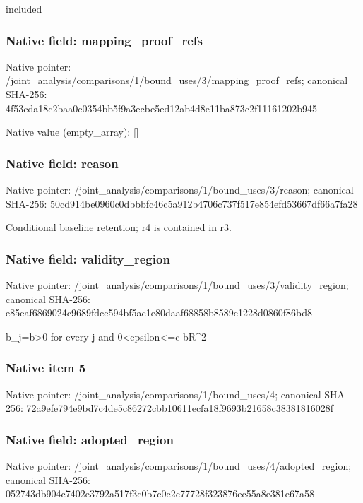 \documentclass[10pt,a4paper]{article}
\begin{document}
\begingroup\raggedright\sloppy included\par\endgroup

\subsubsection{Native field: mapping\_\allowbreak{}proof\_\allowbreak{}refs}
Native pointer: /joint\_\allowbreak{}analysis/comparisons/1/bound\_\allowbreak{}uses/3/mapping\_\allowbreak{}proof\_\allowbreak{}refs; canonical SHA-256: 4f53cda18c2baa0c0354bb5f9a3ecbe5ed12ab4d8e11ba873c2f11161202b945

Native value (empty\_\allowbreak{}array): []

\subsubsection{Native field: reason}
Native pointer: /joint\_\allowbreak{}analysis/comparisons/1/bound\_\allowbreak{}uses/3/reason; canonical SHA-256: 50cd914be0960c0dbbbfc46c5a912b4706c737f517e854efd53667df66a7fa28

\begingroup\raggedright\sloppy Conditional baseline retention;\allowbreak{} r4 is contained in r3.\par\endgroup

\subsubsection{Native field: validity\_\allowbreak{}region}
Native pointer: /joint\_\allowbreak{}analysis/comparisons/1/bound\_\allowbreak{}uses/3/validity\_\allowbreak{}region; canonical SHA-256: e85eaf6869024c9689fdce594bf5ac1e80daaf68858b8589c1228d0860f86bd8

\begingroup\raggedright\sloppy b\_\allowbreak{}j=\allowbreak{}b>0 for every j and 0<epsilon<=\allowbreak{}c bR\textasciicircum{}2\par\endgroup

\subsubsection{Native item 5}
Native pointer: /joint\_\allowbreak{}analysis/comparisons/1/bound\_\allowbreak{}uses/4; canonical SHA-256: 72a9efe794e9bd7c4de5c86272cbb10611ecfa18f9693b21658c38381816028f

\subsubsection{Native field: adopted\_\allowbreak{}region}
Native pointer: /joint\_\allowbreak{}analysis/comparisons/1/bound\_\allowbreak{}uses/4/adopted\_\allowbreak{}region; canonical SHA-256: 052743db904c7402e3792a517f3c0b7c0e2c77728f323876ec55a8e381e67a58
\end{document}
